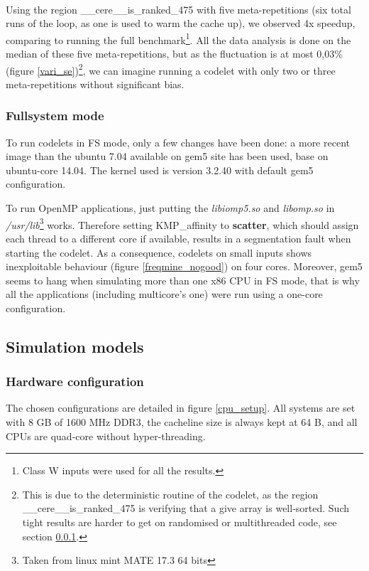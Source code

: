 \documentclass{article}
\begin{document}
\begin{multicols}{2}
\paragraph{}
Using the region \_\_cere\_\_is\_ranked\_475 with five meta-repetitions (six total runs of the loop, as one is used to warm the cache up), we observed 4x speedup, comparing to running the full benchmark\footnote{Class W inputs were used for all the results.}. All the data analysis is done on the median of these five meta-repetitions, but as the fluctuation is at most 0,03\% (figure \ref{vari_se})\footnote{This is due to the deterministic routine of the codelet, as the region \_\_cere\_\_is\_ranked\_475 is verifying that a give array is well-sorted. Such tight results are harder to get on randomised or multithreaded code, see section \ref{FS_mode}.}, we can imagine running a codelet with only two or three meta-repetitions without significant bias.

\subsubsection{Fullsystem mode}
\label{FS_mode}
To run codelets in FS mode, only a few changes have been done: a more recent image than the ubuntu 7.04 available on gem5 site has been used, base on ubuntu-core 14.04. The kernel used is version 3.2.40 with default gem5 configuration.


To run OpenMP applications, just putting the \textit{libiomp5.so} and \textit{libomp.so} in \textit{/usr/lib}\footnote{Taken from linux mint MATE 17.3 64 bits} works. Therefore setting KMP\_affinity to \textbf{scatter}, which should assign each thread to a different core if available, results in a segmentation fault when starting the codelet. As a consequence, codelets on small inputs shows inexploitable behaviour (figure \ref{freqmine_nogood}) on four cores.
 Moreover, gem5 seems to hang when simulating more than one x86 CPU in FS mode, that is why all the applications (including multicore's one) were run using a one-core configuration.

\subsection{Simulation models}
\subsubsection{Hardware configuration}
The chosen configurations are detailed in figure \ref{cpu_setup}. All systems are set with 8 GB of 1600 MHz DDR3, the cacheline size is always kept at 64 B, and all CPUs are quad-core without hyper-threading.


\end{multicols}
\end{document}
